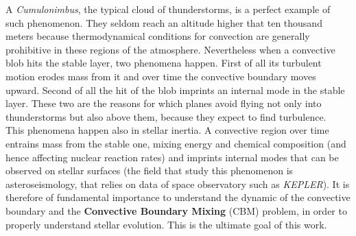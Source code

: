 A \textit{Cumulonimbus}, the typical cloud of thunderstorms, is a perfect example of such phenomenon. They seldom reach an altitude higher that ten thousand meters because thermodynamical conditions for convection are generally prohibitive in these regions of the atmosphere. Nevertheless when a convective blob hits the stable layer, two phenomena happen. First of all its turbulent motion erodes mass from it and over time the convective boundary moves upward. Second of all the hit of the blob imprints an internal mode in the stable layer. These two are the reasons for which planes avoid flying not only into thunderstorms but also above them, because they expect to find turbulence. \\
This phenomena happen also in stellar inertia. A convective region over time entrains mass from the stable one, mixing energy and chemical composition (and hence affecting nuclear reaction rates) and imprints internal modes that can be observed on stellar surfaces (the field that study this phenomenon is asteroseismology, that relies on data of space observatory such as \textit{KEPLER}). It is therefore of fundamental importance to understand the dynamic of the convective boundary and the \textbf{Convective Boundary Mixing} (CBM) problem, in order to properly understand stellar evolution. This is the ultimate goal of this work.


